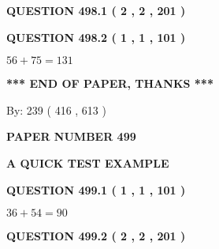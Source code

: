 \documentclass[12pt]{article}
\begin{document}
\vspace{0.2in}
  
{\textbf{\Large{QUESTION
498.1 
 ( 2 , 2 , 201 )
}}}
  
  
  
\vspace{0.2in}
  
{\textbf{\Large{QUESTION
498.2 
 ( 1 , 1 , 101 )
}}}
  
  
 
 

$ %
56 +  %
75=   %
131$
 
 
   
   
 \vspace{0.2in}
 
   
   
   
   
\vspace{1.0in} 
{\textbf{\large{ *** END OF PAPER, THANKS *** }}} 
   
   
\hspace{1.0in} By: 
 239 ( 416 ,  613 )
   
   
   
   
\newpage 
\setcounter{page}{ 
   499001 } 
   
   
   
   
 {\textbf{ \Large{ PAPER NUMBER  499  }}}
   
   
\vspace{0.2in}
   
   
   
   
   
   
 \vspace{0.2in}
{\LARGE {\textbf{ A QUICK TEST EXAMPLE}}}
   
   
  
\vspace{0.2in}
  
{\textbf{\Large{QUESTION
499.1 
 ( 1 , 1 , 101 )
}}}
  
  
 
 

$ %
36 +  %
54=   %
90$
 
 
  
\vspace{0.2in}
  
{\textbf{\Large{QUESTION
499.2 
 ( 2 , 2 , 201 )
}}}
  
  
   
   
 \vspace{0.2in}
 
\end{document}
